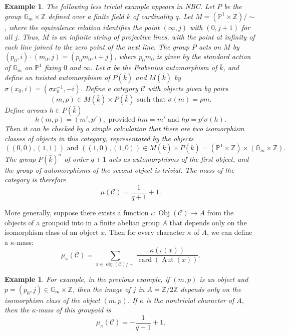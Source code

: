\documentclass[brochure,english,12pt]{bourbaki}
\newtheorem{example}[equation]{Example}
\def\op#1{{\operatorname{#1}}}
\newcommand{\ring}[1]{\mathbb{#1}}
\def\C{{\mathcal C}}
\begin{document}
\begin{example}
The following less trivial example appears in NBC.  Let $P$ be the
group $\ring{G}_m\times \ring{Z}$ defined over a finite field $k$ of cardinality $q$.
Let $M = (\ring{P}^1\times\ring{Z})/\sim$, where the equivalence
relation identifies the point $(\infty,j)$ with $(0,j+1)$   for all $j$.
Thus, $M$ is an infinite string of projective lines, with the point at infinity of each line joined to the
zero point of the next line.  The group $P$ acts on $M$ by $(p_0,i)\cdot
(m_0,j) = (p_0 m_0,i+j)$, where $p_0m_0$ is given by the standard action of
$\ring{G}_m$ on $\ring{P}^1$ fixing $0$ and $\infty$.  
Let $\sigma$ be the Frobenius automorphism
of $\bar k$, and define an twisted automorphism of $P(\bar k)$ and $M(\bar k)$
by $\sigma(x_0,i) = (\sigma x_0^{-1},-i)$.  Define a category $\mathcal C$ with
objects given by pairs 
\begin{equation}
(m,p)\in M(\bar k)\times P(\bar k) \text{ such that } \sigma(m) = p
m.
\end{equation}  
Define  arrows $h\in P(\bar k)$ 
\begin{equation}
h(m,p) = (m',p'),    \text{ provided } hm = m' \text{ and } h p = p'\sigma(h).
\end{equation}  
Then it can be checked by a simple
calculation that there are two isomorphism classes of objects in this
category, representated by the objects
\[
((0,0),(1,1))\text{ and }  ((1,0),(1,0))\in M(\bar k)\times P(\bar k) = 
(\ring{P}^1\times\ring{Z}) \times (\ring{G}_m\times\ring{Z}).
\]
The group $P(\bar k)^\sigma$ of order $q+1$ acts as automorphisms of the first object,
and the group of automorphisms of the second object is trivial.  The mass of the category
is therefore
\[
\mu(\C) = \frac{1}{q+1} + 1.
\]
\end{example}

More generally, suppose there exists a function $\iota:\op{Obj}(\C)\to  A$ from the objects
of a groupoid into in a finite abelian group $A$ that
depends only on the isomorphism class of an object $x$.  Then for every
character $\kappa$ of $A$, we can define a $\kappa$-mass:
\[
\mu_\kappa(\C)= \sum_{x\in \op{obj}(\C)/\sim} \frac{\kappa(\iota(x))}{\op{card}(\op{Aut}(x))}.
\]

\begin{example}
For example, in the previous example, if $(m,p)$ is an object and $p=(p_0,j)\in \ring{G}_m\times\ring{Z}$,
then the image of $j$ in $A=\ring{Z}/2\ring{Z}$ depends only on the isomorphism class of the
object $(m,p)$.  If $\kappa$ is the nontrivial character of $A$, then the 
$\kappa$-mass of this groupoid is
\[
\mu_\kappa(\C) = -\frac{1}{q+1} + 1.
\]
\end{example}
\end{document}
